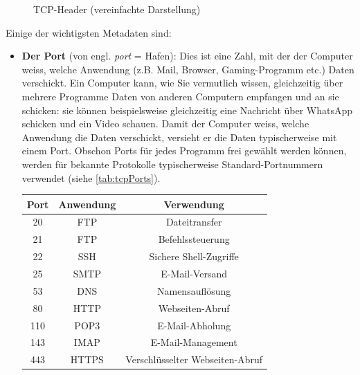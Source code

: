 \begin{figure}[H]
	\centering
	
	\caption{\gls{TCP}-Header (vereinfachte Darstellung)}
	\label{fig:tcp-header}
\end{figure}


Einige der wichtigsten Metadaten sind:

\begin{itemize}
	\item \textbf{Der Port} (von engl. \textit{port} = Hafen): Dies ist eine Zahl, mit der der Computer weiss, welche Anwendung (z.B. Mail, Browser, Gaming-Programm etc.) Daten verschickt. Ein Computer kann, wie Sie vermutlich wissen, gleichzeitig über mehrere Programme Daten von anderen Computern empfangen und an sie schicken: sie können beispielsweise gleichzeitig eine Nachricht über WhatsApp schicken und ein Video schauen. Damit der Computer weiss, welche Anwendung die Daten verschickt, versieht er die Daten typischerweise mit einem Port. Obschon Ports für jedes Programm frei gewählt werden können, werden für bekannte Protokolle typischerweise Standard-Portnummern verwendet (siehe \cref{tab:tcpPorts}).
	      \begin{table}[H]
		      \centering
		      \begin{tabular}{c||c|c}
			      \toprule
			      \textbf{Port} & \textbf{Anwendung} & \textbf{Verwendung}                   \\
			      \midrule
			      20            & \acrfull{FTP}      & Dateitransfer                         \\
			      21            & \acrfull{FTP}      & Befehlssteuerung                      \\
			      22            & \acrfull{SSH}      & Sichere Shell-Zugriffe                \\
			      25            & \acrfull{SMTP}     & E-Mail-Versand                        \\
			      53            & \acrfull{DNS}      & Namensauflösung                       \\
			      80            & \acrfull{HTTP}     & Webseiten-Abruf                       \\
			      110           & \acrfull{POP3}     & E-Mail-Abholung                       \\
			      143           & \acrfull{IMAP}     & E-Mail-Management                     \\
			      443           & \acrfull{HTTPS}    & Verschlüsselter Webseiten-Abruf       \\

\end{tabular}
\end{table}
\end{itemize}
